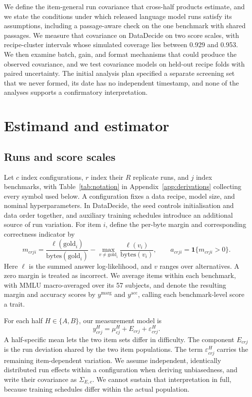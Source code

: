 \documentclass{article}
\begin{document}
We define the item-general run covariance that cross-half products estimate, and we state the conditions under which released language model runs satisfy its assumptions, including a passage-aware check on the one benchmark with shared passages. We measure that covariance on DataDecide on two score scales, with recipe-cluster intervals whose simulated coverage lies between 0.929 and 0.953. We then examine batch, gain, and format mechanisms that could produce the observed covariance, and we test covariance models on held-out recipe folds with paired uncertainty. The initial analysis plan specified a separate screening set that we never formed, its date has no independent timestamp, and none of the analyses supports a confirmatory interpretation.

\section{Estimand and estimator}
\label{sec:estimator}
\subsection{Runs and score scales}
Let $c$ index configurations, $r$ index their $R$ replicate runs, and $j$ index benchmarks, with Table~\ref{tab:notation} in Appendix~\ref{app:derivations} collecting every symbol used below. A configuration fixes a data recipe, model size, and nominal hyperparameters. In DataDecide, the seed controls initialisation and data order together, and auxiliary training schedules introduce an additional source of run variation. For item $i$, define the per-byte margin and corresponding correctness indicator by
\begin{equation}
m_{crji}=\frac{\ell(\mathrm{gold}_i)}{\mathrm{bytes}(\mathrm{gold}_i)}-
\max_{v\ne\mathrm{gold}_i}\frac{\ell(v_i)}{\mathrm{bytes}(v_i)},
\qquad a_{crji}=\mathbf{1}\{m_{crji}>0\}.
\label{eq:scores}
\end{equation}
Here $\ell$ is the summed answer log-likelihood, and $v$ ranges over alternatives. A zero margin is treated as incorrect. We average items within each benchmark, with MMLU macro-averaged over its 57 subjects, and denote the resulting margin and accuracy scores by $y^{\mathrm{marg}}$ and $y^{\mathrm{acc}}$, calling each benchmark-level score a trait.

For each half $H\in\{A,B\}$, our measurement model is
\begin{equation}
y^H_{crj}=\mu^H_{cj}+E_{crj}+\varepsilon^H_{crj}.
\end{equation}
A half-specific mean lets the two item sets differ in difficulty. The component $E_{crj}$ is the run deviation shared by the two item populations. The term $\varepsilon^H_{crj}$ carries the remaining item-dependent variation. We assume independent, identically distributed run effects within a configuration when deriving unbiasedness, and write their covariance as $\Sigma_{E,c}$. We cannot sustain that interpretation in full, because training schedules differ within the actual population.
\end{document}
